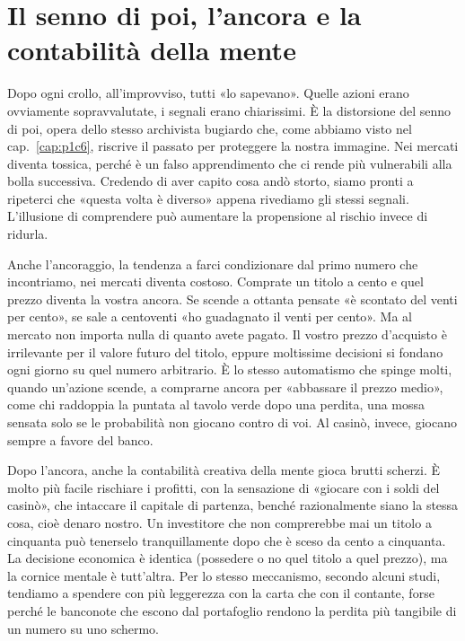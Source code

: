 \section{Il senno di poi, l'ancora e la contabilit\`{a} della mente}
\label{sec:p2c14-senno-di-poi}

Dopo ogni crollo, all'improvviso, tutti «lo sapevano». Quelle azioni erano ovviamente sopravvalutate, i segnali erano chiarissimi. \`{E} la distorsione del senno di poi, opera dello stesso archivista bugiardo che, come abbiamo visto nel cap.~\ref{cap:p1c6}, riscrive il passato per proteggere la nostra immagine. Nei mercati diventa tossica, perch\'{e} \`{e} un falso apprendimento che ci rende pi\`{u} vulnerabili alla bolla successiva. Credendo di aver capito cosa and\`{o} storto, siamo pronti a ripeterci che «questa volta \`{e} diverso» appena rivediamo gli stessi segnali. L'illusione di comprendere pu\`{o} aumentare la propensione al rischio invece di ridurla.

Anche l'ancoraggio, la tendenza a farci condizionare dal primo numero che incontriamo, nei mercati diventa costoso. Comprate un titolo a cento e quel prezzo diventa la vostra ancora. Se scende a ottanta pensate «\`{e} scontato del venti per cento», se sale a centoventi «ho guadagnato il venti per cento». Ma al mercato non importa nulla di quanto avete pagato. Il vostro prezzo d'acquisto \`{e} irrilevante per il valore futuro del titolo, eppure moltissime decisioni si fondano ogni giorno su quel numero arbitrario. \`{E} lo stesso automatismo che spinge molti, quando un'azione scende, a comprarne ancora per «abbassare il prezzo medio», come chi raddoppia la puntata al tavolo verde dopo una perdita, una mossa sensata solo se le probabilit\`{a} non giocano contro di voi. Al casin\`{o}, invece, giocano sempre a favore del banco.

Dopo l'ancora, anche la contabilit\`{a} creativa della mente gioca brutti scherzi. \`{E} molto pi\`{u} facile rischiare i profitti, con la sensazione di «giocare con i soldi del casin\`{o}», che intaccare il capitale di partenza, bench\'{e} razionalmente siano la stessa cosa, cio\`{e} denaro nostro. Un investitore che non comprerebbe mai un titolo a cinquanta pu\`{o} tenerselo tranquillamente dopo che \`{e} sceso da cento a cinquanta. La decisione economica \`{e} identica (possedere o no quel titolo a quel prezzo), ma la cornice mentale \`{e} tutt'altra. Per lo stesso meccanismo, secondo alcuni studi, tendiamo a spendere con pi\`{u} leggerezza con la carta che con il contante, forse perch\'{e} le banconote che escono dal portafoglio rendono la perdita pi\`{u} tangibile di un numero su uno schermo.


